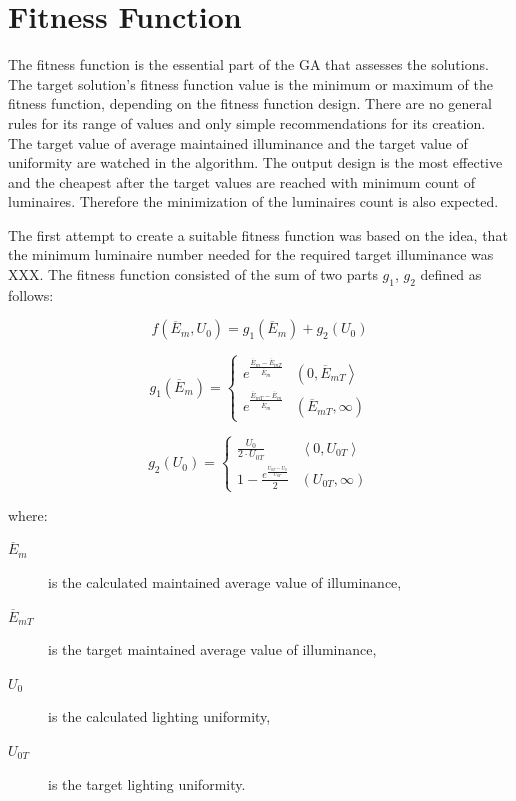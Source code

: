 \section{Fitness Function}
The fitness function is the essential part of the GA that assesses the solutions. The target solution's fitness function value is the minimum or maximum of the fitness function, depending on the fitness function design. There are no general rules for its range of values and only simple recommendations for its creation. The target value of average maintained illuminance and the target value of uniformity are watched in the algorithm. The output design is the most effective and the cheapest after the target values are reached with minimum count of luminaires. Therefore the minimization of the luminaires count is also expected.

The first attempt to create a suitable fitness function was based on the idea, that the minimum luminaire number needed for the required target illuminance was XXX. The fitness function consisted of the sum of two parts $g_1$, $g_2$ defined as follows:

\begin{equation}
\label{eq:fitV1}
f\left(\overline{E}_{m}, U_0\right) = g_1\left(\overline{E}_{m}\right) + g_2\left(U_0\right)
\end{equation}

\begin{equation}
\label{eq:fitV1G1}
	g_1\left(\overline{E}_{m}\right)=
	\begin{cases} 
		e^{\frac{\overline{E}_{m}-\overline{E}_{mT}}{\overline{E}_{m}}} & \left( 0, \overline{E}_{mT}\right\rangle\\
		e^{\frac{\overline{E}_{mT}-\overline{E}_{m}}{\overline{E}_{m}}} & \left( \overline{E}_{mT}, \infty\right)
	\end{cases}
\end{equation}

\begin{equation}
\label{eq:fitV1G2}
	g_2\left(U_0\right)=
	\begin{cases} 
		\frac{U_0}{2\cdot U_{0T}} & \left\langle 0, U_{0T}\right\rangle\\
		1-\frac{e^{\frac{U_{0T}-U_0}{U_{0T}}}}{2} & \left( U_{0T}, \infty\right)
	\end{cases}
\end{equation}

\noindent where:
\begin{description}
	\item[$\overline{E}_{m}$] is the calculated maintained average value of illuminance,
	\item[$\overline{E}_{mT}$] is the target maintained average value of illuminance,
	\item[$U_0$] is the calculated lighting uniformity,
	\item[$U_{0T}$] is the target lighting uniformity.
\end{description}


